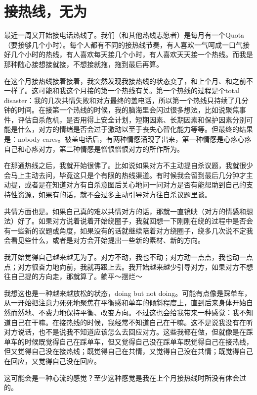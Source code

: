\chapter{接热线，无为}





最近一周又开始接电话热线了。我们（和其他热线志愿者）是每月有一个Quota（要接够几个小时）。每个人都有不同的接热线节奏，有人喜欢一气呵成\pozhehao{}一口气接好几个小时的热线，有人喜欢每天接几个小时，有人喜欢天天接一个热线。而我是那种随心接\pozhehao{}想接就接，不想接就拖，拖到最后再算。

在这个月接热线接着接着，我突然发现我接热线的状态变了，和上个月、和之前不一样了。这可能和我这个月接的第一个热线有关。第一个热线的过程是个total disaster：我的几次共情失败和对方最终的盖电话，所以第一个热线只持续了几分钟的时间。在接第一个热线的时候，我的脑海里会闪过很多想法，比如说聚焦事件，评估自杀危机，是否用得上安全计划，短期因素、长期因素和保护因素分别可能是什么，对方的情绪是否会过于激动以至于丧失心智化能力等等。但最终的结果是：nobody cares。被盖电话后，有两种情感涌现了出来，第一种情感是心疼\pozhehao{}心疼自己和心疼对方，第二种情感是憎恨\pozhehao{}憎恨对方的所作所为。

在那通热线之后，我就开始很佛了。比如说如果对方不主动提自杀议题，我就很少会马上主动去问，毕竟这只是个有限的热线渠道。有时候我会留到最后几分钟才主动提，或者是在知道对方有自杀意图后关心地问一问对方是否有能帮助到自己的支持性资源，如果有的话，就不会过多主动引导对方往自杀议题里谈。

共情方面也是。如果自己真的难以共情对方的话，那就一直镜映（对方的情感和想法）好了。如果对方说着说着开始绕圈子，我就回想一下刚刚在绕的过程中是否会有一些新的议题或角度，如果没有的话就继续陪着对方绕圈子，绕多几次说不定我会看见些什么，或者是对方会开始提出一些新的素材、新的方向。

我开始觉得自己越来越无为了。对方不动，我也不动；对方动一点点，我也动一点点；对方很奋力地向前，我就再跟上去。我开始越来越少引导对方，如果对方不想往自己提的方向走，那就算了。躺平～摆烂～

我想这也是一种越来越放松的状态，doing but not doing。可能有点像是踩单车，从一开始把注意力死死地聚焦在平衡感和单车的倾斜程度上，直到后来身体开始自然而然地、不费力地保持平衡、改变方向。不过这也会给我带来一种感觉：我不知道自己在干嘛。在接热线的时候，我经常不知道自己在干嘛。这不是说我没有在听对方说话，也不是说我不知道应该怎么去回应对方。这些我都在做，但就像是在踩单车的时候\pozhehao{}既觉得自己在踩单车，但又觉得自己没在踩单车\pozhehao{}既觉得自己在接热线，但又觉得自己没在接热线；既觉得自己在共情，又觉得自己没在共情；既觉得自己在回应，又觉得自己没在回应。

这可能会是一种心流的感觉？至少这种感觉是我在上个月接热线时所没有体会过的。


